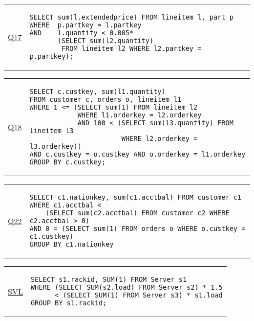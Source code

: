 \hspace{-5mm}\vspace{-8mm}
\begin{tabular}{lp{}}
\begin{rotate}{90}\hspace{-0.9cm}\underline{Q17}\end{rotate} &
{\scriptsize
\begin{verbatim}
SELECT sum(l.extendedprice) FROM lineitem l, part p
WHERE  p.partkey = l.partkey
AND    l.quantity < 0.005*
       (SELECT sum(l2.quantity)
        FROM lineitem l2 WHERE l2.partkey = p.partkey);
\end{verbatim}}
\end{tabular}

\hspace{-5mm}\vspace{-8mm}
\begin{tabular}{lp{}}
\begin{rotate}{90}\hspace{-0.9cm}\underline{Q18}\end{rotate} &
{\scriptsize
\begin{verbatim}
SELECT c.custkey, sum(l1.quantity)
FROM customer c, orders o, lineitem l1
WHERE 1 <= (SELECT sum(1) FROM lineitem l2
            WHERE l1.orderkey = l2.orderkey
            AND 100 < (SELECT sum(l3.quantity) FROM lineitem l3
                       WHERE l2.orderkey = l3.orderkey))
AND c.custkey = o.custkey AND o.orderkey = l1.orderkey
GROUP BY c.custkey;
\end{verbatim}}
\end{tabular}

\hspace{-5mm}\vspace{-8mm}
\begin{tabular}{lp{}}
\begin{rotate}{90}\hspace{-0.9cm}\underline{Q22}\end{rotate} &
{\scriptsize
\begin{verbatim}
SELECT c1.nationkey, sum(c1.acctbal) FROM customer c1
WHERE c1.acctbal <
    (SELECT sum(c2.acctbal) FROM customer c2 WHERE c2.acctbal > 0)
AND 0 = (SELECT sum(1) FROM orders o WHERE o.custkey = c1.custkey)
GROUP BY c1.nationkey
\end{verbatim}}
\end{tabular}

\hspace{-5mm}\vspace{-8mm}
\begin{tabular}{lp{}}
\begin{rotate}{90}\hspace{-0.9cm}\underline{SVL}\end{rotate} &
{\scriptsize
\begin{verbatim}
SELECT s1.rackid, SUM(1) FROM Server s1
WHERE (SELECT SUM(s2.load) FROM Server s2) * 1.5
      < (SELECT SUM(1) FROM Server s3) * s1.load
GROUP BY s1.rackid;
\end{verbatim}}
\end{tabular}

